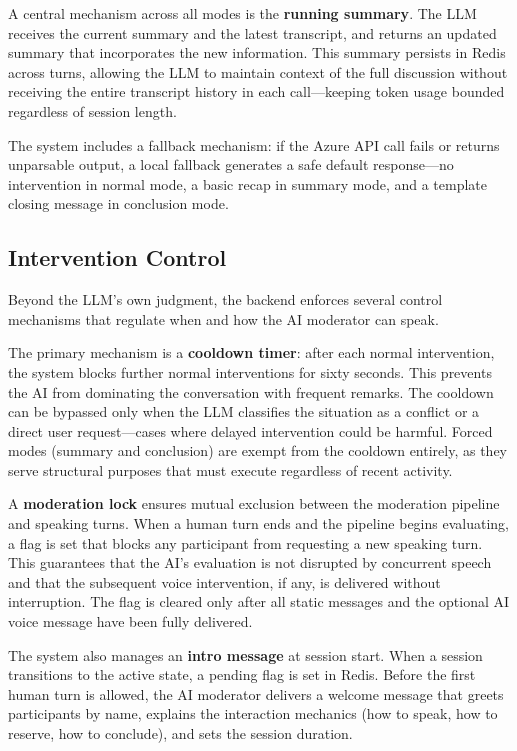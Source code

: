 A central mechanism across all modes is the \textbf{running summary}. The LLM receives the current summary and the latest transcript, and returns an updated summary that incorporates the new information. This summary persists in Redis across turns, allowing the LLM to maintain context of the full discussion without receiving the entire transcript history in each call---keeping token usage bounded regardless of session length.

The system includes a fallback mechanism: if the Azure API call fails or returns unparsable output, a local fallback generates a safe default response---no intervention in normal mode, a basic recap in summary mode, and a template closing message in conclusion mode.


\subsection{Intervention Control}

Beyond the LLM's own judgment, the backend enforces several control mechanisms that regulate when and how the AI moderator can speak.

The primary mechanism is a \textbf{cooldown timer}: after each normal intervention, the system blocks further normal interventions for sixty seconds. This prevents the AI from dominating the conversation with frequent remarks. The cooldown can be bypassed only when the LLM classifies the situation as a conflict or a direct user request---cases where delayed intervention could be harmful. Forced modes (summary and conclusion) are exempt from the cooldown entirely, as they serve structural purposes that must execute regardless of recent activity.

A \textbf{moderation lock} ensures mutual exclusion between the moderation pipeline and speaking turns. When a human turn ends and the pipeline begins evaluating, a flag is set that blocks any participant from requesting a new speaking turn. This guarantees that the AI's evaluation is not disrupted by concurrent speech and that the subsequent voice intervention, if any, is delivered without interruption. The flag is cleared only after all static messages and the optional AI voice message have been fully delivered.

The system also manages an \textbf{intro message} at session start. When a session transitions to the active state, a pending flag is set in Redis. Before the first human turn is allowed, the AI moderator delivers a welcome message that greets participants by name, explains the interaction mechanics (how to speak, how to reserve, how to conclude), and sets the session duration.

